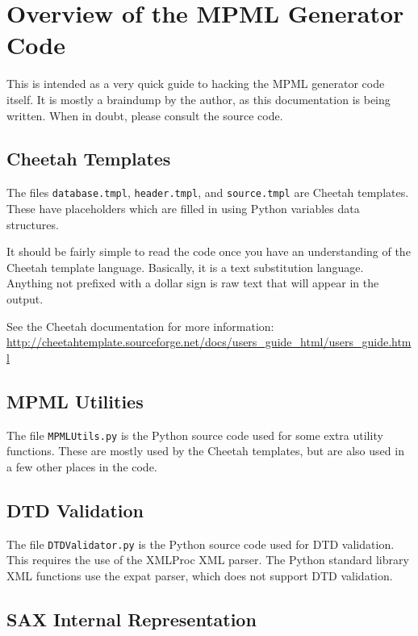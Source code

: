 \documentclass[letterpaper,12pt,oneside,pdftex]{article}
\begin{document}
\section{Overview of the MPML Generator Code}

This is intended as a very quick guide to hacking the MPML generator code
itself. It is mostly a braindump by the author, as this documentation is being
written. When in doubt, please consult the source code.

\subsection{Cheetah Templates}

The files \texttt{database.tmpl}, \texttt{header.tmpl}, and \texttt{source.tmpl}
are Cheetah templates. These have placeholders which are filled in using Python
variables data structures.

It should be fairly simple to read the code once you have an understanding of
the Cheetah template language. Basically, it is a text substitution language.
Anything not prefixed with a dollar sign is raw text that will appear in the
output.

See the Cheetah documentation for more information:\\
\url{http://cheetahtemplate.sourceforge.net/docs/users_guide_html/users_guide.html}

\subsection{MPML Utilities}

The file \texttt{MPMLUtils.py} is the Python source code used for some extra
utility functions. These are mostly used by the Cheetah templates, but are also
used in a few other places in the code.

\subsection{DTD Validation}

The file \texttt{DTDValidator.py} is the Python source code used for DTD
validation. This requires the use of the XMLProc XML parser. The Python standard
library XML functions use the expat parser, which does not support DTD
validation.

\subsection{SAX Internal Representation}
\end{document}
